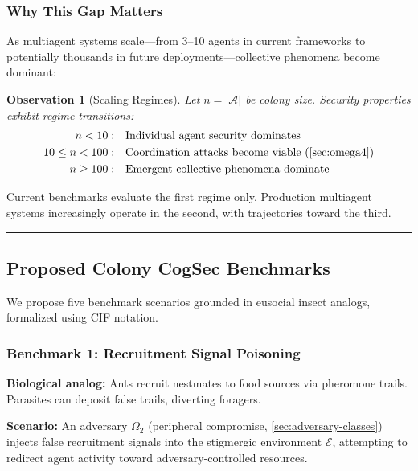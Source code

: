 \documentclass[
]{article}
\newtheorem{observation}[theorem]{Observation}
\begin{document}
\subsubsection{Why This Gap Matters}\label{sec:gap-significance}

As multiagent systems scale---from 3--10 agents in current frameworks to
potentially thousands in future deployments---collective phenomena
become dominant:

\begin{observation}[Scaling Regimes]
\label{obs:scaling-regimes}
Let $n = |\mathcal{A}|$ be colony size. Security properties exhibit regime transitions:
\begin{align}
n < 10: &\quad \text{Individual agent security dominates} \\
10 \leq n < 100: &\quad \text{Coordination attacks become viable (\cref{sec:omega4})} \\
n \geq 100: &\quad \text{Emergent collective phenomena dominate}
\end{align}
\end{observation}

Current benchmarks evaluate the first regime only. Production multiagent
systems increasingly operate in the second, with trajectories toward the
third.

\begin{center}\rule{0.5\linewidth}{0.5pt}\end{center}

\subsection{Proposed Colony CogSec
Benchmarks}\label{sec:proposed-benchmarks}

We propose five benchmark scenarios grounded in eusocial insect analogs,
formalized using CIF notation.

\subsubsection{Benchmark 1: Recruitment Signal
Poisoning}\label{sec:benchmark-recruitment}

\textbf{Biological analog:} Ants recruit nestmates to food sources via
pheromone trails. Parasites can deposit false trails, diverting
foragers.

\textbf{Scenario:} An adversary \(\Omega_2\) (peripheral compromise,
\cref{sec:adversary-classes}) injects false recruitment signals into the
stigmergic environment \(\mathcal{E}\), attempting to redirect agent
activity toward adversary-controlled resources.
\end{document}

